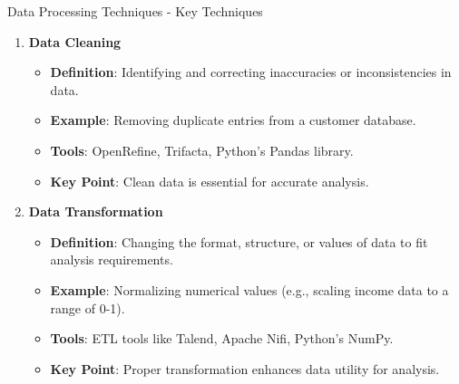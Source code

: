 \documentclass[aspectratio=169]{beamer}
\begin{document}
\begin{frame}[fragile]{Data Processing Techniques - Key Techniques}
    \begin{enumerate}
        \item \textbf{Data Cleaning}
        \begin{itemize}
            \item \textbf{Definition}: Identifying and correcting inaccuracies or inconsistencies in data.
            \item \textbf{Example}: Removing duplicate entries from a customer database.
            \item \textbf{Tools}: OpenRefine, Trifacta, Python's Pandas library.
            \item \textbf{Key Point}: Clean data is essential for accurate analysis.
        \end{itemize}
        
        \item \textbf{Data Transformation}
        \begin{itemize}
            \item \textbf{Definition}: Changing the format, structure, or values of data to fit analysis requirements.
            \item \textbf{Example}: Normalizing numerical values (e.g., scaling income data to a range of 0-1).
            \item \textbf{Tools}: ETL tools like Talend, Apache Nifi, Python's NumPy.
            \item \textbf{Key Point}: Proper transformation enhances data utility for analysis.
        \end{itemize}
    \end{enumerate}
\end{frame}
\end{document}

